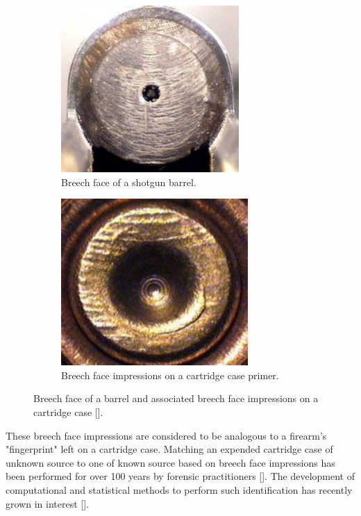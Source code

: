 \begin{figure}[htbp]
  \centering
  \begin{subfigure}[b]{0.49\textwidth}
	 \includegraphics[width = \textwidth,height = 2.5in]{./images/breechFace.pdf}
	\caption{Breech face of a shotgun barrel.}
 	\label{figure:barrelBF}
  \end{subfigure}
  \begin{subfigure}[b]{0.49\textwidth}
	 \includegraphics[width=\textwidth,height = 2.5in]{./images/breechFaceImpression.pdf}
	\caption{Breech face impressions on a cartridge case primer.}
 	\label{figure:impressionsBF}
  \end{subfigure}
\caption{Breech face of a barrel and associated breech face impressions on a cartridge case [\citet{doyle}].}
\end{figure}

These breech face impressions are considered to be analogous to a firearm's "fingerprint" left on a cartridge case. Matching an expended cartridge case of unknown source to one of known source based on breech face impressions has been performed for over 100 years by forensic practitioners [\citet{firearm_id_thompson}]. The development of computational and statistical methods to perform such identification has recently grown in interest [\citet{council_strengthening_2009}].

